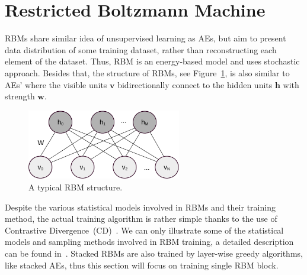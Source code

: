 \section{Restricted Boltzmann Machine}
\label{sec:rbm}
RBMs share similar idea of unsupervised learning as AEs, but aim to present data distribution of some training dataset, rather than reconstructing each element of the dataset.
Thus, RBM is an energy-based model and uses stochastic approach.
Besides that, the structure of RBMs, see Figure~\ref{fig:RBM}, is also similar to AEs' where the visible units $\mathbf{v}$ bidirectionally connect to the hidden units $\mathbf{h}$ with strength $\mathbf{w}$.


\begin{figure}[hbt]
	\centering
	\includegraphics[width=0.6\textwidth]{pics_sdlm/rbm_o.pdf}
	\caption{A typical RBM structure.}
	\label{fig:RBM}
\end{figure}

Despite the various statistical models involved in RBMs and their training method, the actual training algorithm is rather simple thanks to the use of Contrastive Divergence~(CD)~\cite{hinton2002training}.
We can only illustrate some of the statistical models and sampling methods involved in RBM training, a detailed description can be found in~\cite{fischer2012introduction}. 
Stacked RBMs are also trained by layer-wise greedy algorithms, like stacked AEs, thus this section will focus on training single RBM block.


